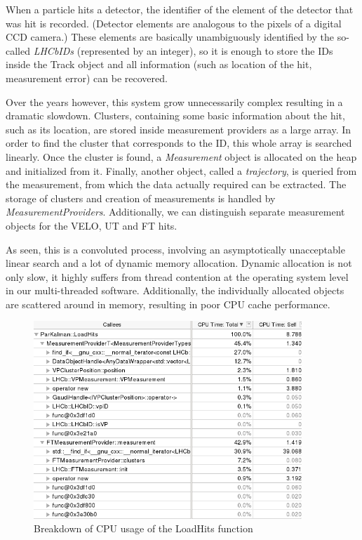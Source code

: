 \documentclass[12pt]{article}
\begin{document}
When a particle hits a detector, the identifier of the element of the detector that was hit is recorded. (Detector elements are analogous to the pixels of a digital CCD camera.) These elements are basically unambiguously identified by the so-called \textit{LHCbIDs} (represented by an integer), so it is enough to store the IDs inside the Track object and all information (such as location of the hit, measurement error) can be recovered. 

Over the years however, this system grow unnecessarily complex resulting in a dramatic slowdown. Clusters, containing some basic information about the hit, such as its location, are stored inside measurement providers as a large array. In order to find the cluster that corresponds to the ID, this whole array is searched linearly. Once the cluster is found, a \textit{Measurement} object is allocated on the heap and initialized from it. Finally, another object, called a \textit{trajectory}, is queried from the measurement, from which the data actually required can be extracted. The storage of clusters and creation of measurements is handled by \textit{MeasurementProviders}. Additionally, we can distinguish separate measurement objects for the VELO, UT and FT hits.

As seen, this is a convoluted process, involving an asymptotically unacceptable linear search and a lot of dynamic memory allocation. Dynamic allocation is not only slow, it highly suffers from thread contention at the operating system level in our multi-threaded software. Additionally, the individually allocated objects are scattered around in memory, resulting in poor CPU cache performance.

\begin{figure}[H]
	\begin{center}
		\includegraphics[width=0.9\textwidth]{kalmanfit_loadhits_breakdown}
	\end{center}
	\caption{Breakdown of CPU usage of the LoadHits function}
	\label{fig_kalmanfit_loadhits_breakdown}
\end{figure}
\end{document}
